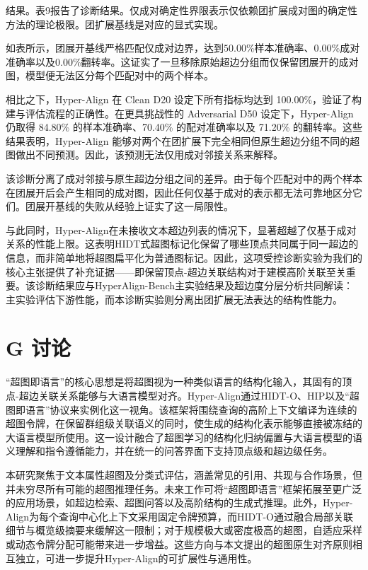 \documentclass[10pt]{article}
\begin{document}
结果。表9报告了诊断结果。仅成对确定性界限表示仅依赖团扩展成对图的确定性方法的理论极限。团扩展基线是对应的显式实现。

如表所示，团展开基线严格匹配仅成对边界，达到\({50.00}\%\)样本准确率、\({0.00}\%\)成对准确率以及0.00\%翻转率。这证实了一旦移除原始超边分组而仅保留团展开的成对图，模型便无法区分每个匹配对中的两个样本。

相比之下，Hyper-Align 在 Clean D20 设定下所有指标均达到 100.00\%，验证了构建与评估流程的正确性。在更具挑战性的 Adversarial D50 设定下，Hyper-Align 仍取得 84.80\% 的样本准确率、70.40\% 的配对准确率以及 71.20\% 的翻转率。这些结果表明，Hyper-Align 能够对两个在团扩展下完全相同但原生超边分组不同的超图做出不同预测。因此，该预测无法仅用成对邻接关系来解释。

该诊断分离了成对邻接与原生超边分组之间的差异。由于每个匹配对中的两个样本在团展开后会产生相同的成对图，因此任何仅基于成对的表示都无法可靠地区分它们。团展开基线的失败从经验上证实了这一局限性。

与此同时，Hyper-Align在未接收文本超边列表的情况下，显著超越了仅基于成对关系的性能上限。这表明HIDT式超图标记化保留了哪些顶点共同属于同一超边的信息，而非简单地将超图扁平化为普通图标记。因此，这项受控诊断实验为我们的核心主张提供了补充证据——即保留顶点-超边关联结构对于建模高阶关联至关重要。该诊断结果应与HyperAlign-Bench主实验结果及超边度分层分析共同解读：主实验评估下游性能，而本诊断实验则分离出团扩展无法表达的结构性能力。

\section*{G 讨论}

“超图即语言”的核心思想是将超图视为一种类似语言的结构化输入，其固有的顶点-超边关联关系能够与大语言模型对齐。Hyper-Align通过HIDT-O、HIP以及“超图即语言”协议来实例化这一视角。该框架将围绕查询的高阶上下文编译为连续的超图令牌，在保留群组级关联语义的同时，使生成的结构化表示能够直接被冻结的大语言模型所使用。这一设计融合了超图学习的结构化归纳偏置与大语言模型的语义理解和指令遵循能力，并在统一的问答界面下支持顶点级和超边级任务。

本研究聚焦于文本属性超图及分类式评估，涵盖常见的引用、共现与合作场景，但并未穷尽所有可能的超图推理任务。未来工作可将“超图即语言”框架拓展至更广泛的应用场景，如超边检索、超图问答以及高阶结构的生成式推理。此外，Hyper-Align为每个查询中心化上下文采用固定令牌预算，而HIDT-O通过融合局部关联细节与概览级摘要来缓解这一限制；对于规模极大或密度极高的超图，自适应采样或动态令牌分配可能带来进一步增益。这些方向与本文提出的超图原生对齐原则相互独立，可进一步提升Hyper-Align的可扩展性与通用性。
\end{document}

